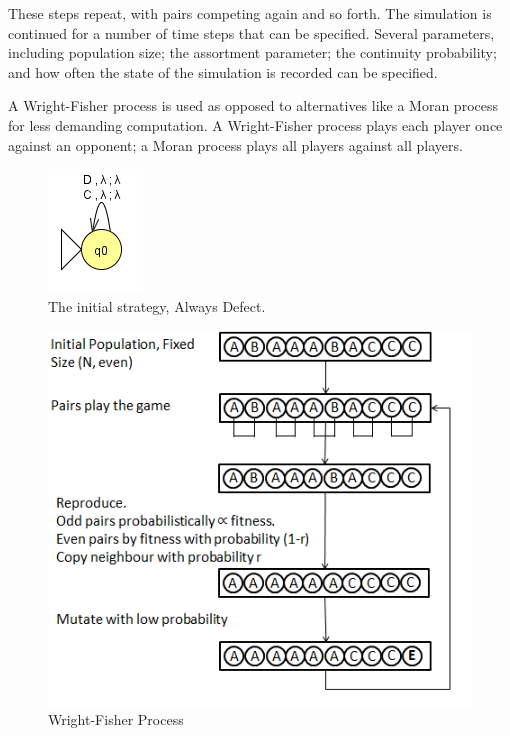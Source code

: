 \documentclass[a4paper,11pt,bcshonoursthesis,singlespace,oneside,thesisdraft,pdflatex]{cssethesis}
\begin{document}
These steps repeat, with pairs competing again and so forth. 
The simulation is continued for a number of time steps that can be specified. 
Several parameters, including population size; the assortment parameter; the continuity probability; and how often the state of the simulation is recorded can be specified. 

A Wright-Fisher process is used as opposed to alternatives like a Moran process \citep{moran1962statistical} for less demanding computation. A Wright-Fisher process plays each player once against an opponent; a Moran process plays all players against all players. 

\begin{figure}[h]
\centering
\includegraphics{alwaysDefect}
\caption{The initial strategy, Always Defect.}
\label{fig:alld}
\end{figure}
\begin{figure}[h]
\centering
\includegraphics{wrightfischer}
\caption{Wright-Fisher Process}
\label{fig:wright}
\end{figure}
\pagebreak
\end{document}
